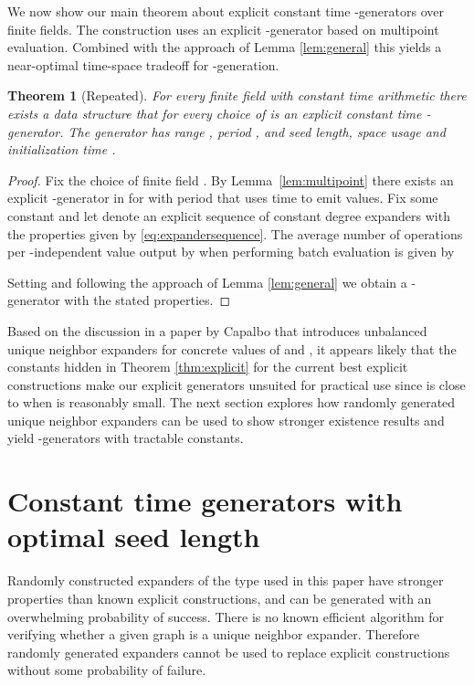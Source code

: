 \documentclass[a4paper,11pt]{article}
\theoremstyle{plain}
\newtheorem{restate}{Theorem}
\theoremstyle{definition}
\begin{document}
We now show our main theorem about explicit constant time -generators over finite fields. 
The construction uses an explicit -generator based on multipoint evaluation. 
Combined with the approach of Lemma \ref{lem:general} this yields a near-optimal time-space tradeoff for -generation.
\begin{restate}[Repeated]
For every finite field  with constant time arithmetic there exists a data structure that for every choice of  is an explicit constant time -generator.
The generator has range , period , and seed length, space usage and initialization time .
\end{restate}
\begin{proof}
Fix the choice of finite field . 
By Lemma~\ref{lem:multipoint} there exists an explicit -generator in  for  with period  that uses time  to emit  values.
Fix some constant  and let  denote an explicit sequence of constant degree expanders with the properties given by \eqref{eq:expandersequence}.
The average number of operations per -independent value output by  when performing batch evaluation is given by

Setting  and following the approach of Lemma \ref{lem:general} we obtain a -generator with the stated properties. 
\end{proof}
Based on the discussion in a paper by Capalbo \cite{capalbo2005} that introduces unbalanced unique neighbor expanders for concrete values of  and , it appears likely that the constants hidden in Theorem \ref{thm:explicit} for the current best explicit constructions make our explicit generators unsuited for practical use since  is close to  when  is reasonably small. 
The next section explores how randomly generated unique neighbor expanders can be used to show stronger existence results and yield -generators with tractable constants.  
\section{Constant time generators with optimal seed length} \label{sec:probabilistic}
Randomly constructed expanders of the type used in this paper have stronger properties than known explicit constructions, and can be generated with an overwhelming probability of success.
There is no known efficient algorithm for verifying whether a given graph is a unique neighbor expander.
Therefore randomly generated expanders cannot be used to replace explicit constructions without some probability of failure.
\end{document}
